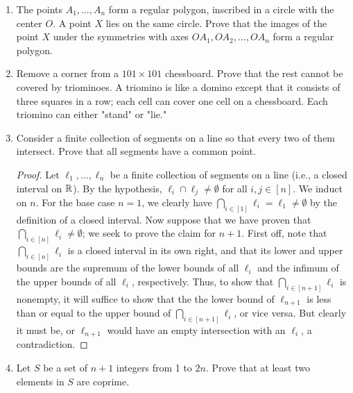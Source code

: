 \documentclass[../apprentice.tex]{subfiles}
\begin{document}
\begin{enumerate}
\begin{proof}
    \end{proof}
    \item The points $A_1,\dots,A_n$ form a regular polygon, inscribed in a circle with the center $O$. A point $X$ lies on the same circle. Prove that the images of the point $X$ under the symmetries with axes $OA_1,OA_2,\dots,OA_n$ form a regular polygon.
    \item Remove a corner from a $101\times 101$ chessboard. Prove that the rest cannot be covered by triominoes. A triomino is like a domino except that it consists of three squares in a row; each cell can cover one cell on a chessboard. Each triomino can either "stand" or "lie."
    \item Consider a finite collection of segments on a line so that every two of them intersect. Prove that all segments have a common point.
    \begin{proof}
        Let $\ell_1,\dots,\ell_n$ be a finite collection of segments on a line (i.e., a closed interval on $\mathbb{R}$). By the hypothesis, $\ell_i\cap\ell_j\neq\emptyset$ for all $i,j\in[n]$. We induct on $n$. For the base case $n=1$, we clearly have $\bigcap_{i\in[1]}\ell_i=\ell_1\neq\emptyset$ by the definition of a closed interval. Now suppose that we have proven that $\bigcap_{i\in[n]}\ell_i\neq\emptyset$; we seek to prove the claim for $n+1$. First off, note that $\bigcap_{i\in[n]}\ell_i$ is a closed interval in its own right, and that its lower and upper bounds are the supremum of the lower bounds of all $\ell_i$ and the infimum of the upper bounds of all $\ell_i$, respectively. Thus, to show that $\bigcap_{i\in[n+1]}\ell_i$ is nonempty, it will suffice to show that the the lower bound of $\ell_{n+1}$ is less than or equal to the upper bound of $\bigcap_{i\in[n+1]}\ell_i$, or vice versa. But clearly it must be, or $\ell_{n+1}$ would have an empty intersection with an $\ell_i$, a contradiction.
    \end{proof}
    \item Let $S$ be a set of $n+1$ integers from 1 to $2n$. Prove that at least two elements in $S$ are coprime.
\end{enumerate}
\end{document}
